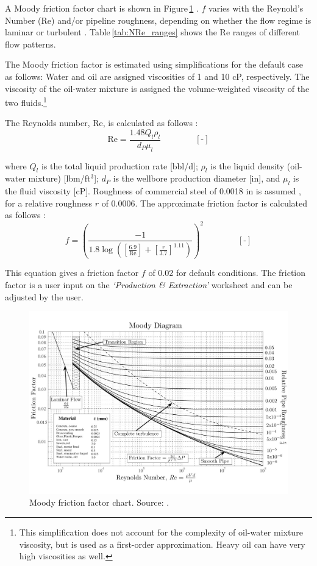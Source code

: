 \documentclass[11pt]{report}
\newcommand{\sheet}[1]{\textit{`{#1}'}}
\newcommand{\eqnunit}[1]{\quad\quad \scriptstyle{\left[\text{#1}\right]}}
\begin{document}
A Moody friction factor chart is shown in Figure\,\ref{fig:Moody_chart} \cite{Moody2008}. $f$ varies with the Reynold's Number (Re) and/or pipeline roughness, depending on whether the flow regime is laminar or turbulent \cite[p. 481]{Mcallister2009}. Table\,\ref{tab:NRe_ranges} shows the Re ranges of different flow patterns. 

The Moody friction factor is estimated using simplifications for the default case as follows: Water and oil are assigned viscosities of 1 and 10 cP, respectively. The viscosity of the oil-water mixture is assigned the volume-weighted viscosity of the two fluids.\footnote{This simplification does not account for the complexity of oil-water mixture viscosity, but is used as a first-order approximation. Heavy oil can have very high viscosities as well.} 

The Reynolds number, Re, is calculated as follows \cite[p. 46]{Guo2007}:
\begin{equation}\label{eq:Nre}
\textrm{Re} = \frac{1.48 Q_l \rho_l}{d_P \mu_l} \quad\quad\eqnunit{-}
\end{equation} 

where $Q_l$ is the total liquid production rate [bbl/d]; $\rho_l$ is the liquid density (oil-water mixture) [lbm/ft$^3$]; $d_P$ is the wellbore production diameter [in], and $\mu_l$ is the fluid viscosity [cP]. Roughness of commercial steel of 0.0018 in is assumed \cite{Cengel2005}, for a relative roughness $r$ of 0.0006. The approximate friction factor is calculated as follows \cite[p. 625]{Cengel2005}:
\begin{equation}\label{eq:fric_factor}
f = \left( \frac{-1}{1.8\log\left(\left[ \frac{6.9}{\textrm{Re}}\right] + \left[ \frac{r}{3.7} \right]^{1.11} \right) } \right)^{2} \quad\quad\eqnunit{-}
\end{equation} 

This equation gives a friction factor $f$ of 0.02 for default conditions. The friction factor is a user input on the \sheet{Production \& Extraction} worksheet and can be adjusted by the user. 

\begin{figure}
\includegraphics[width=0.95\columnwidth]{images/Moody_chart.pdf}
\caption{Moody friction factor chart. Source: \cite{Moody2008}.}
\label{fig:Moody_chart}
\end{figure}
\end{document}
